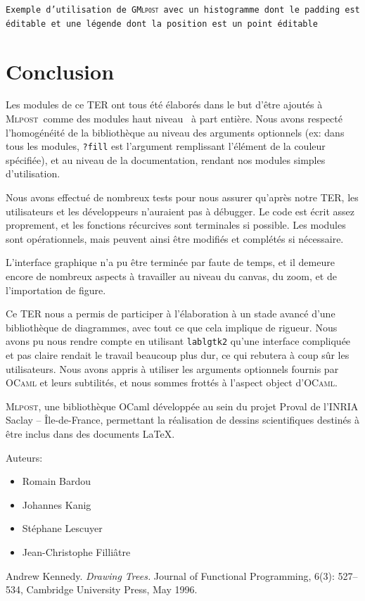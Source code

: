\documentclass[a4paper,12pt]{article}
\newcommand{\mlpost}{\textsc{Mlpost}}
\newcommand{\gmlpost}{\textsc{GMlpost}}
\begin{document}
\begin{center}
\texttt{Exemple d'utilisation de \gmlpost\ avec un histogramme dont le padding est éditable et une légende dont la position est un point éditable } 
\end{center}

\section{Conclusion}
Les modules de ce TER ont tous été élaborés dans le but d'être ajoutés à \mlpost\ comme des modules \og haut niveau \fg\ à part entière. Nous avons respecté l'homogénéité de la bibliothèque au niveau des arguments optionnels (ex: dans tous les modules, \texttt{?fill} est l'argument remplissant l'élément de la couleur spécifiée), et au niveau de la documentation, rendant nos modules simples d'utilisation.

Nous avons effectué de nombreux tests pour nous assurer qu'après notre TER, les utilisateurs et les développeurs n'auraient pas à débugger. Le code est écrit assez proprement, et les fonctions récurcives sont terminales si possible.
Les modules sont opérationnels, mais peuvent ainsi être modifiés et complétés si nécessaire.

L'interface graphique n'a pu être terminée par faute de temps, et il demeure encore de nombreux aspects à travailler au niveau du canvas, du zoom, et de l'importation de figure.

Ce TER nous a permis de participer à l'élaboration à un stade avancé d'une bibliothèque de diagrammes, avec tout ce que cela implique de rigueur. Nous avons pu nous rendre compte en utilisant \texttt{lablgtk2} qu'une interface compliquée et pas claire rendait le travail beaucoup plus dur, ce qui rebutera à coup sûr les utilisateurs. Nous avons appris à utiliser les arguments optionnels fournis par \textsc{OCaml} et leurs subtilités, et nous sommes frottés à l'aspect object d'\textsc{OCaml}.

\begin{thebibliography}{99}
 \mlpost, une bibliothèque OCaml développée au sein du projet Proval de l’INRIA Saclay – Île-de-France, permettant la réalisation de dessins scientifiques destinés à être inclus dans des documents \LaTeX.

Auteurs:
\begin{itemize}
    \item Romain Bardou
    \item Johannes Kanig
    \item Stéphane Lescuyer
    \item Jean-Christophe Filliâtre 
\end{itemize}

Andrew Kennedy. 
\emph{Drawing Trees.}
Journal of Functional Programming, 
6(3): 527--534, Cambridge University Press, May 1996.
\end{thebibliography}
\end{document}
